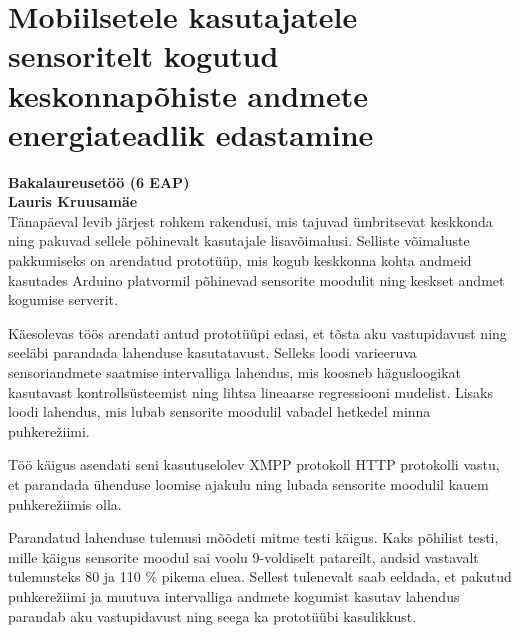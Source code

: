 \chapter[Resümee]{Mobiilsetele kasutajatele sensoritelt kogutud keskonnapõhiste andmete energiateadlik edastamine} %
\textbf{Bakalaureusetöö (6 EAP)}\\
\textbf{Lauris Kruusamäe}\\

Tänapäeval levib järjest rohkem rakendusi, mis tajuvad ümbritsevat keskkonda ning pakuvad sellele põhinevalt kasutajale lisavõimalusi. Selliste võimaluste pakkumiseks on arendatud prototüüp, mis kogub keskkonna kohta andmeid kasutades Arduino platvormil põhinevad sensorite moodulit ning keskset andmet kogumise serverit. 

Käesolevas töös arendati antud prototüüpi edasi, et tõsta aku vastupidavust ning seeläbi parandada lahenduse kasutatavust. Selleks loodi varieeruva sensoriandmete saatmise intervalliga lahendus, mis koosneb hägusloogikat kasutavast kontrollsüsteemist ning lihtsa lineaarse regressiooni mudelist. Lisaks loodi lahendus, mis lubab sensorite moodulil vabadel hetkedel minna puhkerežiimi.

Töö käigus asendati seni kasutuselolev XMPP protokoll HTTP protokolli vastu, et parandada ühenduse loomise ajakulu ning lubada sensorite moodulil kauem puhkerežiimis olla.

Parandatud lahenduse tulemusi mõõdeti mitme testi käigus. Kaks põhilist testi, mille käigus sensorite moodul sai voolu 9-voldiselt patareilt, andsid vastavalt tulemusteks 80 ja 110 \% pikema eluea. Sellest tulenevalt saab eeldada, et pakutud puhkerežiimi ja muutuva intervalliga andmete kogumist kasutav lahendus parandab aku vastupidavust ning seega ka prototüübi kasulikkust.




\ifpdf
    \graphicspath{{7/figures/PNG/}{7/figures/PDF/}{7/figures/}}
\else
    \graphicspath{{7/figures/EPS/}{7/figures/}}
\fi








